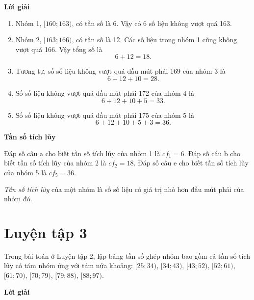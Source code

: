 \documentclass[
  letterpaper,
  DIV=11,
  numbers=noendperiod]{scrartcl}
\providecommand{\tightlist}{%
  \setlength{\itemsep}{0pt}\setlength{\parskip}{0pt}}\usepackage{longtable,booktabs,array}
\begin{document}
\begin{center}
\textbf{Lời giải}
\end{center}

\begin{enumerate}
\def\labelenumi{\alph{enumi}.}
\tightlist
\item
  Nhóm 1, \([160; 163)\), có tần số là 6. Vậy có 6 số liệu không vượt
  quá 163.
\item
  Nhóm 2, \([163; 166)\), có tần số là 12. Các số liệu trong nhóm 1 cũng
  không vượt quá 166. Vậy tổng số là \[
  6+12=18.
  \]
\item
  Tương tự, số số liệu không vượt quá đầu mút phải 169 của nhóm 3 là \[
  6+12+10=28.
  \]
\item
  Số số liệu không vượt quá đầu mút phải 172 của nhóm 4 là \[
  6+12+10+5=33.
  \]
\item
  Số số liệu không vượt quá đầu mút phải 175 của nhóm 5 là \[
  6+12+10+5+3=36.
  \]
\end{enumerate}

\begin{tcolorbox}[enhanced jigsaw, breakable, opacityback=0, left=2mm, leftrule=.75mm, arc=.35mm, colframe=quarto-callout-note-color-frame, rightrule=.15mm, colback=white, bottomrule=.15mm, toprule=.15mm]

\vspace{-3mm}\textbf{Tần số tích lũy}\vspace{3mm}

Đáp số câu a cho biết tần số tích lũy của nhóm 1 là \(cf_1=6\). Đáp số
câu b cho biết tần số tích lũy của nhóm 2 là \(cf_2=18\). Đáp số câu e
cho biết tần số tích lũy của nhóm 5 là \(cf_5=36\).

\emph{Tần số tích lũy} của một nhóm là số số liệu có giá trị nhỏ hơn đầu
mút phải của nhóm đó.

\end{tcolorbox}

\section*{Luyện tập 3}

Trong bài toán ở Luyện tập 2, lập bảng tần số ghép nhóm bao gồm cả tần
số tích lũy có tám nhóm ứng với tám nửa khoång: \([25; 34)\),
\([34; 43)\), \([43; 52)\), \([52; 61)\), \([61; 70)\), \([70; 79)\),
\([79 ; 88)\), \([88; 97)\).

\begin{center}
\textbf{Lời giải}
\end{center}
\end{document}

